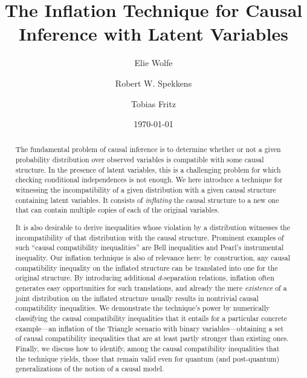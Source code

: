 \documentclass[aps,english,superscriptaddress,onecolumn,twoside,longbibliography,pra,floatfix,fleqn,nofootinbib]{revtex4-1}%
\theoremstyle{definition}
\begin{document}
\title{The Inflation Technique for Causal Inference with Latent Variables}

\author{Elie Wolfe}

\author{Robert W. Spekkens}

\author{Tobias Fritz}

\date{\today}


\begin{abstract}

The fundamental problem of causal inference is to determine whether or not a given probability distribution over observed variables is compatible with some causal structure. In the presence of latent variables, this is a challenging problem for which checking conditional independences is not enough. We here introduce a technique for witnessing the incompatibility of a given distribution with a given causal structure containing latent variables. It consists of  {\em inflating} the causal structure to a new one that can contain multiple copies of each of the original variables.

It is also desirable to derive inequalities whose violation by a distribution witnesses the incompatibility of that distribution with the causal structure. Prominent examples of such ``causal compatibility inequalities'' are Bell inequalities and Pearl's instrumental inequality.
Our inflation technique is also of relevance here: by construction, any causal compatibility inequality on the inflated structure can be translated into one for the original structure. By introducing additional $d$-separation relations, inflation often generates easy opportunities for such translations, and already the mere \emph{existence} of a joint distribution on the inflated structure usually results in nontrivial causal compatibility inequalities.
We demonstrate the technique's power by numerically classifying the causal compatibility inequalities that it entails for a particular concrete example---an inflation of the Triangle scenario with binary variables---obtaining a set of causal compatibility inequalities that are at least partly stronger than existing ones.
Finally, we discuss how to identify, among the causal compatibility inequalities that the technique yields, those that remain valid even for quantum (and post-quantum) generalizations of the notion of a causal model.
\end{abstract}
\end{document}
